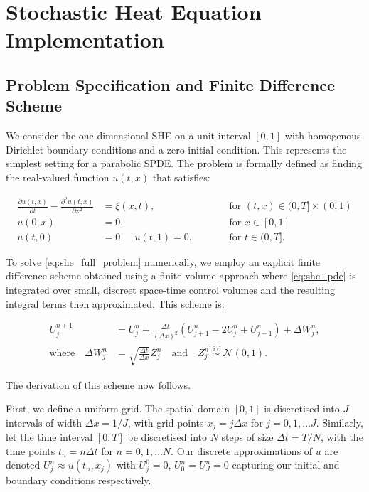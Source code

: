 \section{Stochastic Heat Equation Implementation}\label{sec:she_implementation}
\subsection{Problem Specification and Finite Difference Scheme}\label{sec:she_scheme_mlmc_imp}

We consider the one-dimensional SHE on a unit interval $[0,1]$ with
homogenous Dirichlet boundary conditions and a zero initial condition.
This represents the simplest setting for a parabolic SPDE. 
The problem is formally defined as finding the real-valued 
function $u(t,x)$ that satisfies:

\begin{subequations} \label{eq:she_full_problem}
\begin{align}
    \frac{\partial u(t,x)}{\partial t} - \frac{\partial^2 u(t,x)}{\partial x^2} &= \xi(x,t),
    \qquad &&\text{for } (t,x) \in (0, T] \times (0,1) \label{eq:she_pde} \\
    u(0,x) &= 0, \qquad &&\text{for } x \in [0,1] \label{eq:she_ic} \\
    u(t,0) &= 0, \quad u(t,1) = 0, \qquad &&\text{for } t \in (0, T]. \label{eq:she_bc}
\end{align}
\end{subequations}

To solve \eqref{eq:she_full_problem} numerically, we employ
an explicit finite difference scheme
obtained using a finite volume approach \cite{suli2025nspdes} where \eqref{eq:she_pde}
is integrated over small, discreet space-time control volumes
and the resulting integral terms then approximated.
This scheme is:

\begin{align}
    U_j^{n+1} &= U_j^n + \frac{\Delta t}{(\Delta x)^2} 
    (U_{j+1}^n - 2U_j^n + U_{j-1}^n) + \Delta W_j^n, \label{eq:she_scheme} \\
    \text{where} \quad \Delta W_j^n &= \sqrt{\frac{\Delta t}{\Delta x}} 
    Z_j^n \quad \text{and} \quad Z_j^n \overset{\mathrm{i.i.d.}}{\sim} \mathcal{N}(0,1). \nonumber
\end{align}

The derivation of this scheme now follows.

First, we define a uniform grid. The spatial domain 
$[0,1]$ is discretised into $J$ intervals of width 
$\Delta x = 1 / J$, with grid points $x_j = j \Delta x$ for 
$j = 0, 1, \dots J$. Similarly, let the time interval 
$[0, T]$ be discretised into $N$ steps of size $\Delta t 
= T / N$, with the time points $t_n = n \Delta t$ for 
$n = 0, 1, \dots N$. 
Our discrete approximations of $u$ are denoted $U_j^n \approx 
u(t_n, x_j)$ with $U_j^0 = 0$, $U_0^n = U_J^n = 0$ 
capturing our initial and boundary conditions respectively.

